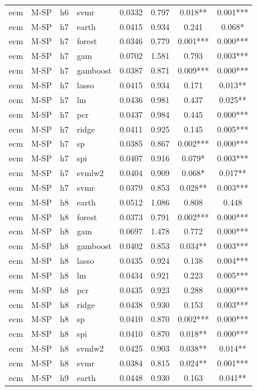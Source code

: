 \begin{ThreePartTable}
\begin{longtable}[t]{llclcccc}
ecm & M-SP & h6 & svmr & 0.0332 & 0.797 & 0.018** & 0.001***\\
\addlinespace
ecm & M-SP & h7 & earth & 0.0415 & 0.934 & 0.241 & 0.068*\\
ecm & M-SP & h7 & forest & 0.0346 & 0.779 & 0.001*** & 0.000***\\
ecm & M-SP & h7 & gam & 0.0702 & 1.581 & 0.793 & 0.003***\\
ecm & M-SP & h7 & gamboost & 0.0387 & 0.871 & 0.009*** & 0.000***\\
ecm & M-SP & h7 & lasso & 0.0415 & 0.934 & 0.171 & 0.013**\\
ecm & M-SP & h7 & lm & 0.0436 & 0.981 & 0.437 & 0.025**\\
ecm & M-SP & h7 & pcr & 0.0437 & 0.984 & 0.445 & 0.000***\\
ecm & M-SP & h7 & ridge & 0.0411 & 0.925 & 0.145 & 0.005***\\
ecm & M-SP & h7 & sp & 0.0385 & 0.867 & 0.002*** & 0.000***\\
ecm & M-SP & h7 & spi & 0.0407 & 0.916 & 0.079* & 0.003***\\
ecm & M-SP & h7 & svmlw2 & 0.0404 & 0.909 & 0.068* & 0.017**\\
ecm & M-SP & h7 & svmr & 0.0379 & 0.853 & 0.028** & 0.003***\\
\addlinespace
ecm & M-SP & h8 & earth & 0.0512 & 1.086 & 0.808 & 0.448\\
ecm & M-SP & h8 & forest & 0.0373 & 0.791 & 0.002*** & 0.000***\\
ecm & M-SP & h8 & gam & 0.0697 & 1.478 & 0.772 & 0.000***\\
ecm & M-SP & h8 & gamboost & 0.0402 & 0.853 & 0.034** & 0.003***\\
ecm & M-SP & h8 & lasso & 0.0435 & 0.924 & 0.138 & 0.004***\\
ecm & M-SP & h8 & lm & 0.0434 & 0.921 & 0.223 & 0.005***\\
ecm & M-SP & h8 & pcr & 0.0435 & 0.923 & 0.288 & 0.000***\\
ecm & M-SP & h8 & ridge & 0.0438 & 0.930 & 0.153 & 0.003***\\
ecm & M-SP & h8 & sp & 0.0410 & 0.870 & 0.002*** & 0.000***\\
ecm & M-SP & h8 & spi & 0.0410 & 0.870 & 0.018** & 0.000***\\
ecm & M-SP & h8 & svmlw2 & 0.0425 & 0.903 & 0.038** & 0.014**\\
ecm & M-SP & h8 & svmr & 0.0384 & 0.815 & 0.024** & 0.001***\\
\addlinespace
ecm & M-SP & h9 & earth & 0.0448 & 0.930 & 0.163 & 0.041**\\

\end{longtable}
\end{ThreePartTable}
